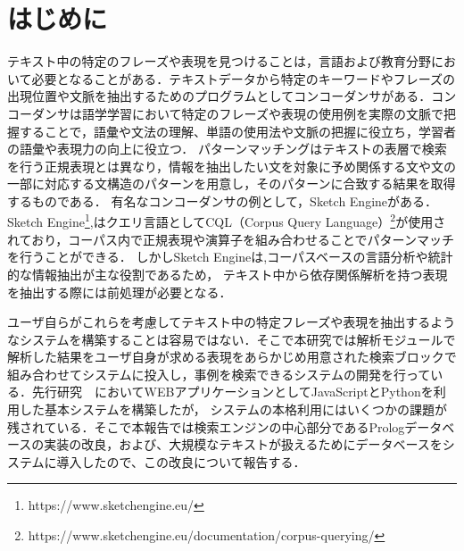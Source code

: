 \documentclass{FITpaper}
\begin{document}
\maketitle

\section{はじめに}
テキスト中の特定のフレーズや表現を見つけることは，言語および教育分野において必要となることがある．テキストデータから特定のキーワードやフレーズの出現位置や文脈を抽出するためのプログラムとしてコンコーダンサがある．コンコーダンサは語学学習において特定のフレーズや表現の使用例を実際の文脈で把握することで，語彙や文法の理解、単語の使用法や文脈の把握に役立ち，学習者の語彙や表現力の向上に役立つ．
パターンマッチングはテキストの表層で検索を行う正規表現とは異なり，情報を抽出したい文を対象に予め関係する文や文の一部に対応する文構造のパターンを用意し，そのパターンに合致する結果を取得するものである．
有名なコンコーダンサの例として，Sketch Engineがある．Sketch Engine\footnote{https://www.sketchengine.eu/},はクエリ言語としてCQL（Corpus Query Language）\footnote{https://www.sketchengine.eu/documentation/corpus-querying/}が使用されており，コーパス内で正規表現や演算子を組み合わせることでパターンマッチを行うことができる．
しかしSketch Engineは,コーパスベースの言語分析や統計的な情報抽出が主な役割であるため，
テキスト中から依存関係解析を持つ表現を抽出する際には前処理が必要となる．

ユーザ自らがこれらを考慮してテキスト中の特定フレーズや表現を抽出するようなシステムを構築することは容易ではない．そこで本研究では解析モジュールで解析した結果をユーザ自身が求める表現をあらかじめ用意された検索ブロックで組み合わせてシステムに投入し，事例を検索できるシステムの開発を行っている．先行研究　においてWEBアプリケーションとしてJavaScriptとPythonを利用した基本システムを構築したが，
システムの本格利用にはいくつかの課題が残されている．そこで本報告では検索エンジンの中心部分であるPrologデータベースの実装の改良，および、大規模なテキストが扱えるためにデータベースをシステムに導入したので、この改良について報告する．
\end{document}
